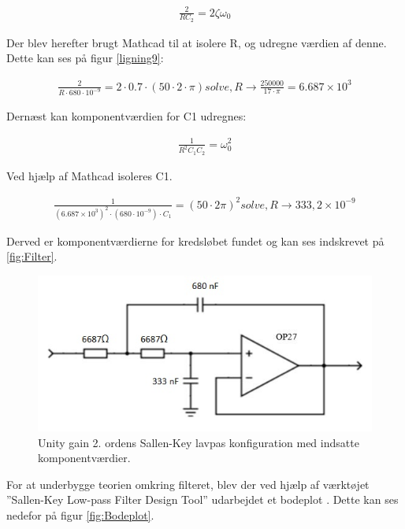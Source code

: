 \begin{align}
\frac{2}{RC_{2}}=2\zeta\omega_{0}
\label{ligning8}
\end{align}

Der blev herefter brugt Mathcad til at isolere R, og udregne værdien af denne. Dette kan ses på figur \ref{ligning9}:

\begin{align}
\frac{2}{R\cdot680\cdot10^{-9}}=2\cdot0.7\cdot(50\cdot2\cdot\pi) solve, R \to \frac{250000}{17\cdot\pi}=6.687\times 10^3
\label{ligning9}
\end{align}

Dernæst kan komponentværdien for C1 udregnes:


\begin{align*}
\frac{1}{R^2C_{1}C_{2}}=\omega_{0}^2
\label{ligning10}
\end{align*}	

Ved hjælp af Mathcad isoleres C1. 

\begin{align}
	\frac{1}{(6.687\times 10^{3})^{2}\cdot(680\cdot10^{-9})\cdot C_1}=(50\cdot 2\pi)^{2} solve, R \to 333,2\times 10^{-9}
\end{align}

Derved er komponentværdierne for kredsløbet fundet og kan ses indskrevet på \ref{fig:Filter}. 

\begin{figure}[H]
	\centering
	\includegraphics[width=1\textwidth]{Figurer/Hardware/FilterDesignMedKomponentvaerdier}
	\caption{Unity gain 2. ordens Sallen-Key lavpas konfiguration med indsatte komponentværdier.}
	\label{fig:Filter_K}
\end{figure}

For at underbygge teorien omkring filteret, blev der ved hjælp af værktøjet ”Sallen-Key Low-pass Filter Design Tool” udarbejdet et bodeplot \cite{Overforing}. Dette kan ses nedefor på figur \ref{fig:Bodeplot}. 

